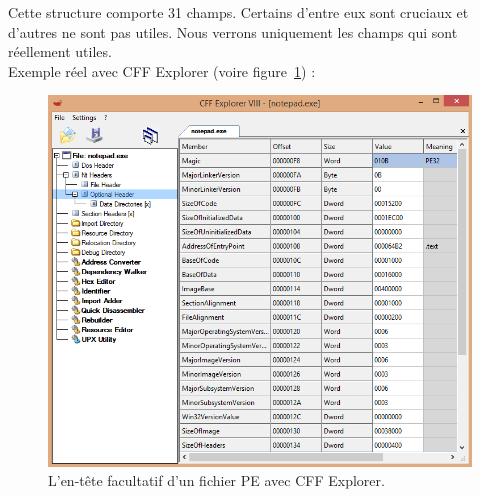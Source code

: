 Cette structure comporte 31 champs. Certains d'entre eux sont cruciaux et d'autres ne sont pas utiles. Nous verrons uniquement les champs qui sont réellement utiles.\\
Exemple réel avec CFF Explorer (voire figure~\ref{fig :pic4}) :
\begin{figure}[H]
\begin{center}
\includegraphics[scale=0.7]{Figures/pic4.PNG}
\caption{ L'en-tête facultatif d'un fichier PE avec CFF Explorer.}
\label{fig :pic4} 
\end{center}
\end{figure}


